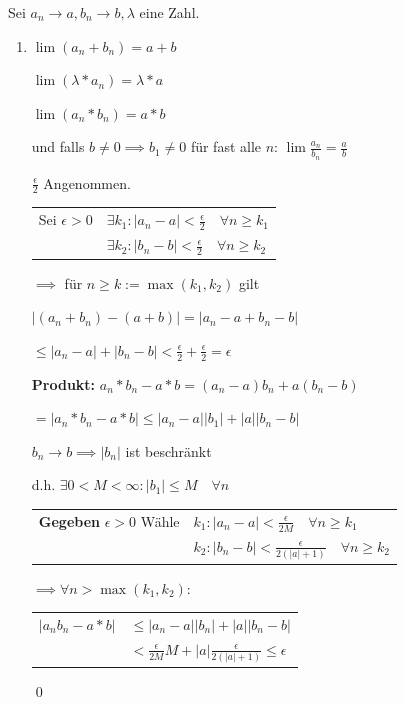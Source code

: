 \documentclass[fleqn]{scrartcl}
\renewenvironment{proof}{{\bfseries Beweis }}{\qed}
\begin{document}
Sei $a_n\to a, b_n \to b, \lambda $ eine Zahl.

\begin{enumerate}
  \item $\lim(a_n+b_n)=a+b$
  
    $\lim(\lambda*a_n)=\lambda*a$
    
    $\lim(a_n*b_n)=a*b$
    
    und falls $b \neq 0 \implies b_1 \neq 0$ für fast alle $n$: $\lim \frac{a_n}{b_n} = \frac{a}{b}$ 
 
  \begin{proof}
    
    $\frac{\epsilon}{2}$ Angenommen.
    
    \begin{tabular}{rl}
      Sei $\epsilon > 0$ & $\exists k_1:|a_n-a|<\frac{\epsilon}{2} \quad \forall n \geq k_1$ \\
    
                         & $\exists k_2:|b_n-b|<\frac{\epsilon}{2} \quad \forall n \geq k_2$
    \end{tabular}

    $\implies$ für $n\geq k := \max(k_1,k_2)$ gilt

    $|(a_n+b_n)-(a+b)|=|a_n-a+b_n-b|$
  
    $\leq |a_n-a| + |b_n-b| < \frac{\epsilon}{2}+\frac{\epsilon}{2}= \epsilon$
  
    \textbf{Produkt:} $a_n*b_n-a*b=(a_n-a)b_n+a(b_n-b)$
  
    $=|a_n*b_n -a*b| \leq |a_n-a||b_1|+|a||b_n-b|$
    
    $b_n \to b \implies |b_n|$ ist beschränkt 
    
    d.h. $\exists 0 < M < \infty: |b_1| \leq M \quad \forall n$
    
    \begin{tabular}{rl}
      \textbf{Gegeben} $\epsilon > 0$ Wähle & $k_1: |a_n-a|<\frac{\epsilon}{2M} \quad \forall n \geq k_1$ \\
                                            & $k_2: |b_n-b|<\frac{\epsilon}{2(|a|+1)} \quad \forall n \geq k_2$
    \end{tabular}

	$\implies \forall n > \max(k_1,k_2):$


    \begin{tabular}{rl}
      $|a_nb_n-a*b|$ & $\leq |a_n-a||b_n|+|a||b_n-b|$ \\
                     & $< \frac{\epsilon}{2M}M+|a|\frac{\epsilon}{2(|a|+1)} \leq \epsilon$
    \end{tabular}
    

\end{proof}
\end{enumerate}
\end{document}
